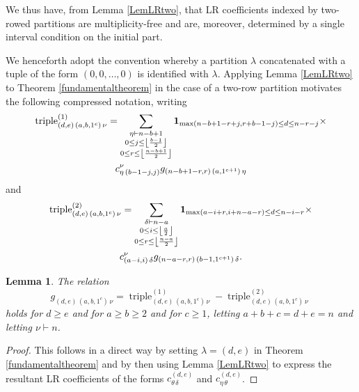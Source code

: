 \documentclass[12pt]{article}
\newtheorem{lemma}{Lemma}%
\begin{document}
 We thus have, from Lemma \ref{LemLRtwo}, that LR coefficients indexed by two-rowed partitions are multiplicity-free and are, moreover, 
 determined by a single interval condition on the initial part. 

 We henceforth adopt the convention whereby a partition $\lambda$ concatenated with a tuple of the form $(0, 0, \ldots, 0)$ is identified 
 with $\lambda$. Applying Lemma \ref{LemLRtwo} to Theorem \ref{fundamentaltheorem} in the case of a two-row partition motivates the 
 following compressed notation, writing 
\begin{multline*} 
 \operatorname{triple}^{(1)}_{(d, e) \, (a, b, 1^c) \, \nu} = \sum_{ \substack{ \eta \vdash n - b + 1 \\
 0 \leq j \leq \left\lfloor \frac{b-1}{2} \right\rfloor \\ 
 0 \leq r \leq \left\lfloor \frac{n-b+1}{2} \right\rfloor } } 
 \text{{\bf 1}}_{\max( n - b + 1 - r + j, r + b - 1 - j ) \leq d \leq n - r - j } \times \\
 c_{\eta \, (b-1-j, j)}^{\nu} g_{ (n - b + 1 - r, r) \, (a, 1^{c+1}) \, \eta }
\end{multline*}
 and 
\begin{multline*} 
 \operatorname{triple}^{(2)}_{(d, e) \, (a, b, 1^c) \, \nu} = \sum_{ \substack{ \delta \vdash n - a \\
 0 \leq i \leq \left\lfloor \frac{a}{2} \right\rfloor \\ 
 0 \leq r \leq \left\lfloor \frac{n-a}{2} \right\rfloor } } 
 \text{{\bf 1}}_{\max( a - i + r, i + n - a - r ) 
 \leq d \leq n - i - r } \times \\
 c_{(a-i, i) \, \delta}^{\nu} g_{ (n - a - r, r) \, (b-1, 1^{c+1}) \, \delta}. 
\end{multline*}

\begin{lemma}\label{triple1and2}
 The relation $$ g_{(d, e) \, (a, b, 1^c) \, \nu} = \operatorname{triple}^{(1)}_{(d, e) \, (a, b, 1^c) \, \nu} - \operatorname{triple}^{(2)}_{(d, 
 e) \, (a, b, 1^c) \, \nu} $$ holds for $d \geq e$ and for $a \geq b \geq 2$ and for $c \geq 1$, letting $a + b + c = d + e =n$ and 
 letting $\nu \vdash n$. 
\end{lemma}

\begin{proof}
 This follows in a direct way by setting $\lambda = (d, e)$ in Theorem \ref{fundamentaltheorem} and by then using Lemma \ref{LemLRtwo} 
 to express the resultant LR coefficients of the forms $c_{\theta \, \delta}^{(d, e)}$ and $c_{\eta \, \theta}^{(d, e)}$. 
\end{proof}
\end{document}
